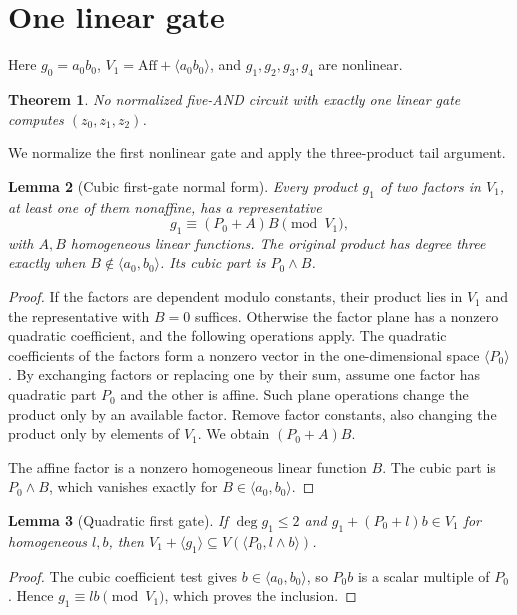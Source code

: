 \documentclass[11pt,a4paper]{article}
\theoremstyle{plain}
\newtheorem{theorem}{Theorem}
\newtheorem{lemma}[theorem]{Lemma}
\theoremstyle{remark}
\theoremstyle{plain}
\newcommand{\Aff}{\mathrm{Aff}}
\begin{document}
\section{One linear gate}\label{sec:lambda1}
Here $g_0=a_0b_0$, $V_1=\Aff+\langle a_0b_0\rangle$, and $g_1,g_2,g_3,g_4$ are nonlinear.

\begin{theorem}\label{l1:thm:main}
No normalized five-AND circuit with exactly one linear gate computes $(z_0,z_1,z_2)$.
\end{theorem}
We normalize the first nonlinear gate and apply the three-product tail argument.

\begin{lemma}[Cubic first-gate normal form]\label{l1:lem:cubic}
Every product $g_1$ of two factors in $V_1$, at least one of them nonaffine, has a representative
\[
g_1\equiv(P_0+A)B\pmod{V_1},
\]
with $A,B$ homogeneous linear functions. The original product has degree three exactly when $B\notin\langle a_0,b_0\rangle$. Its cubic part is $P_0\wedge B$.
\end{lemma}
\begin{proof}
If the factors are dependent modulo constants, their product lies in $V_1$ and the representative with $B=0$ suffices. Otherwise the factor plane has a nonzero quadratic coefficient, and the following operations apply.
The quadratic coefficients of the factors form a nonzero vector in the one-dimensional space $\langle P_0\rangle$. By exchanging factors or replacing one by their sum, assume one factor has quadratic part $P_0$ and the other is affine. Such plane operations change the product only by an available factor. Remove factor constants, also changing the product only by elements of $V_1$. We obtain $(P_0+A)B$.

The affine factor is a nonzero homogeneous linear function $B$. The cubic part is $P_0\wedge B$, which vanishes exactly for $B\in\langle a_0,b_0\rangle$.
\end{proof}

\begin{lemma}[Quadratic first gate]\label{l1:lem:reduce}
If $\deg g_1\le2$ and $g_1+(P_0+l)b\in V_1$ for homogeneous $l,b$, then $V_1+\langle g_1\rangle\subseteq V(\langle P_0,l\wedge b\rangle)$.
\end{lemma}
\begin{proof}
The cubic coefficient test gives $b\in\langle a_0,b_0\rangle$, so $P_0b$ is a scalar multiple of $P_0$. Hence $g_1\equiv lb\pmod{V_1}$, which proves the inclusion.
\end{proof}
\end{document}
